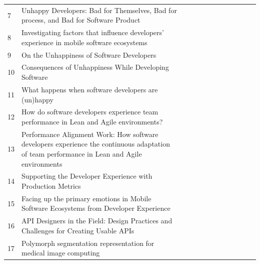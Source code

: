 \documentclass[english, 12pt, a4paper, sci, utf8, a-1b, online]{aaltothesis}
\begin{document}
\begin{center}
\begin{longtable}{p{0.05\linewidth}p{0.65\linewidth}p{0.30\linewidth}}
    7  & Unhappy Developers: Bad for Themselves, Bad for process, and Bad for Software Product                                                       & \cite{unhappy-developers}                         \\
    8  & Investigating factors that influence developers' experience in mobile software ecosystems                                                   & \cite{fontao2017investigating}                    \\
    9  & On the Unhappiness of Software Developers                                                                                                   & \cite{on-the-unhappiness}                         \\
    10 & Consequences of Unhappiness While Developing Software                                                                                       & \cite{consequences-of-unhappiness}                \\
    11 & What happens when software developers are (un)happy                                                                                         & \cite{what-happens-when-unhappy}                  \\
    12 & How do software developers experience team performance in Lean and Agile environments?                                                      & \cite{how-developers-experience-team-performance} \\
    13 & Performance Alignment Work: How software developers experience the continuous adaptation of team performance in Lean and Agile environments & \cite{paw}                                        \\
    14 & Supporting the Developer Experience with Production Metrics                                                                                 & \cite{chatley2019supporting}                      \\
    15 & Facing up the primary emotions in Mobile Software Ecosystems from Developer Experience                                                      & \cite{fontao2017facing}                           \\
    16 & API Designers in the Field: Design Practices and Challenges for Creating Usable APIs                                                        & \cite{api-designers}                              \\
    17 & Polymorph segmentation representation for medical image computing                                                                           & \cite{pinter2019polymorph}                        \\

\end{longtable}
\end{center}
\end{document}
